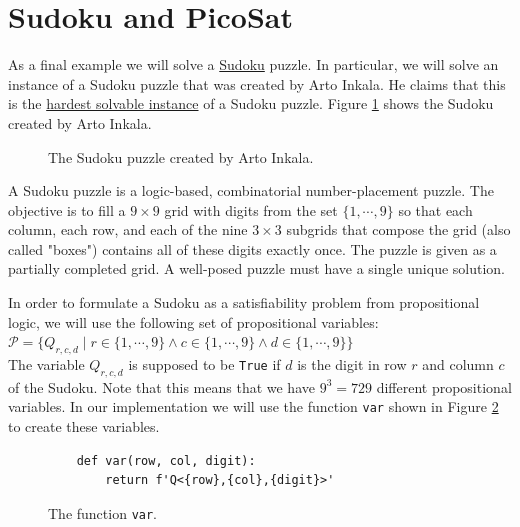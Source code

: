 \pagebreak

\section{Sudoku and PicoSat}
As a final example we will solve a \href{https://en.wikipedia.org/wiki/Sudoku}{Sudoku} puzzle.  In particular,
we will solve an instance of a Sudoku puzzle that was created by Arto Inkala.  He claims that this is the
\href{https://abcnews.go.com/blogs/headlines/2012/06/can-you-solve-the-hardest-ever-sudoku}{hardest solvable instance}
of a Sudoku puzzle.  Figure \ref{fig:sudoku.png} shows the Sudoku created by Arto Inkala.

\begin{figure}[!ht]
  \centering
  \caption{The Sudoku puzzle created by Arto Inkala.}
  \label{fig:sudoku.png}
\end{figure}

A Sudoku puzzle is a logic-based, combinatorial number-placement puzzle. The objective is to fill a
$9 \times 9$ grid with digits from the set $\{1, \cdots, 9\}$ so that each column, each row, and each of the
nine $3 \times 3$ subgrids that compose the grid (also called "boxes") contains all of these digits exactly
once.  The puzzle is given as a partially completed grid.  A well-posed puzzle must have a single unique
solution.

In order to formulate a Sudoku as a satisfiability problem from propositional logic, we will use the following
set of propositional variables:
\\[0.2cm]
\hspace*{1.3cm}
$\mathcal{P} = \bigl\{ Q_{r,c,d} \mid r \in \{1,\cdots, 9\} \wedge c \in \{1,\cdots, 9\} \wedge d \in \{1,\cdots, 9\} \bigl\}$
\\[0.2cm]
The variable $Q_{r,c,d}$ is supposed to be \texttt{True} if $d$ is the digit in row $r$ and column $c$ of the
Sudoku.  Note that this means that we have $9^3 = 729$ different propositional variables.  In our
implementation we will use the function \texttt{var} shown in Figure \ref{fig:sudoku-var} to create these variables.

\begin{figure}[!ht]
\centering
\begin{verbatim}
    def var(row, col, digit):
        return f'Q<{row},{col},{digit}>'
\end{verbatim}
\vspace*{-0.3cm}
\caption{The function \texttt{var}.}
\label{fig:sudoku-var}
\end{figure}

